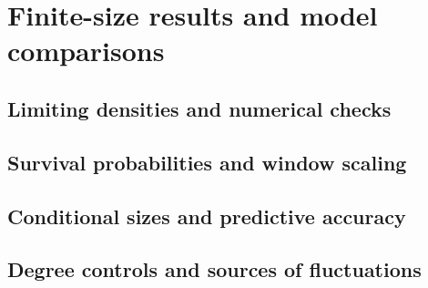 \section{Finite-size results and model comparisons}
\label{sec:numerical-results}

\subsection{Limiting densities and numerical checks}
\label{sec:limiting-benchmarks}

\subsection{Survival probabilities and window scaling}
\label{sec:survival-results}

\subsection{Conditional sizes and predictive accuracy}
\label{sec:conditional-results}

\subsection{Degree controls and sources of fluctuations}
\label{sec:controlled-comparison-results}

\par\allowbreak

